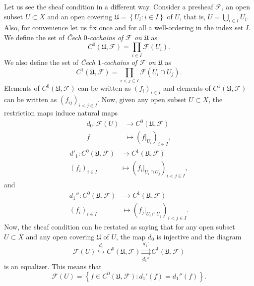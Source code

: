 \documentclass[12pt,a4paper]{article}
\begin{document}
  Let us see the sheaf condition in a different way. Consider a presheaf $\mathcal{F}$, an open subset $U\subset X$ and an open covering $\mathfrak{U}=\left\{ U_i: i \in I \right\}$ of $U$, that is, $U=\bigcup_{i \in I} U_i$. Also, for convenience let us fix once and for all a well-ordering in the index set $I$. We define the set of \emph{\v{C}ech $0$-cochains of $\mathcal{F}$ on $\mathfrak{U}$} as
  \begin{equation*}
    C^0(\mathfrak{U},\mathcal{F})=\prod_{i \in I} \mathcal{F}(U_i).
  \end{equation*}
We also define the set of \emph{\v{C}ech $1$-cochains of $\mathcal{F}$ on $\mathfrak{U}$} as
  \begin{equation*}
    C^1(\mathfrak{U},\mathcal{F})=\prod_{i<j \in I} \mathcal{F}(U_i\cap U_j).
  \end{equation*}
  Elements of $C^0(\mathfrak{U},\mathcal{F})$ can be written as $(f_i)_{i\in I}$ and elements of $C^1(\mathfrak{U},\mathcal{F})$ can be written as $(f_{ij})_{i<j \in I}$. 
  Now, given any open subset $U\subset X$, the restriction maps induce natural maps
  \begin{align*}
    d_0: \mathcal{F}(U)&\longrightarrow C^0(\mathfrak{U},\mathcal{F})\\ 
    f &\longmapsto (f|_{U_i})_{i \in I}, 
    \end{align*}
  \begin{align*}
    d'_1: C^0(\mathfrak{U},\mathcal{F})&\longrightarrow C^1(\mathfrak{U},\mathcal{F})\\ 
    (f_{i})_{i \in I} &\longmapsto (f_i|_{U_i\cap U_j})_{i<j \in I} , 
    \end{align*}
    and
  \begin{align*}
    d_1'': C^0(\mathfrak{U},\mathcal{F})&\longrightarrow C^1(\mathfrak{U},\mathcal{F})\\ 
    (f_{i})_{i \in I} &\longmapsto (f_{j}|_{U_i \cap U_j})_{i<j \in I}.
    \end{align*}
    Now, the sheaf condition can be restated as saying that for any open subset $U\subset X$ and any open covering $\mathfrak{U}$ of $U$, the map $d_0$ is injective and the diagram
    \begin{equation*}
      \mathcal{F}(U) \overset{d_0}{\hookrightarrow} C^0(\mathfrak{U},\mathcal{F}) \underset{d_1''}{\overset{d_1'}{\rightrightarrows}} C^1(\mathfrak{U},\mathcal{F})
    \end{equation*}
    is an equalizer. This means that
    \begin{equation*}
      \mathcal{F}(U)= \left\{ f\in C^0(\mathfrak{U},\mathcal{F}): d_1'(f)=d_1''(f) \right\}.
    \end{equation*}
\end{document}
